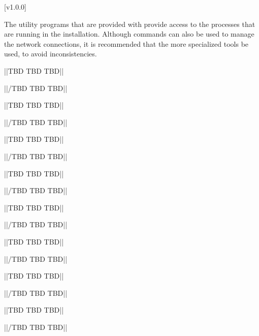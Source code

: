 [v1.0.0]

The utility programs that are provided with \mplusm{} provide access to the processes that
are running in the \mplusm{} installation. Although \yarp{} commands can also be used to
manage the network connections, it is recommended that the more specialized \mplusm{}
tools be used, to avoid inconsistencies.


||TBD TBD TBD||

||/TBD TBD TBD||


||TBD TBD TBD||

||/TBD TBD TBD||


\secondaryEnd{}


||TBD TBD TBD||

||/TBD TBD TBD||


||TBD TBD TBD||

||/TBD TBD TBD||



||TBD TBD TBD||

||/TBD TBD TBD||


\secondaryEnd{}


||TBD TBD TBD||

||/TBD TBD TBD||


||TBD TBD TBD||

||/TBD TBD TBD||



||TBD TBD TBD||

||/TBD TBD TBD||

